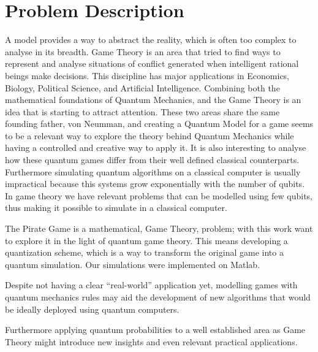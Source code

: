 \section{Problem Description}
\label{sec:int_problem}

A model provides a way to abstract the reality, which is often too complex to analyse in its breadth. Game Theory is an area that tried to find ways to represent and analyse situations of conflict generated when intelligent rational beings make decisions. This discipline has major applications in Economics, Biology, Political Science, and Artificial Intelligence. 
Combining both the mathematical foundations of Quantum Mechanics, and the Game Theory is an idea that is starting to attract attention. These two areas share the same founding father, von Neumman, and creating a Quantum Model for a game seems to be a relevant way to explore the theory behind Quantum Mechanics while having a controlled and creative way to apply it. It is also interesting to analyse how these quantum games differ from their well defined classical counterparts. Furthermore  simulating quantum algorithms on a classical computer is usually impractical because this systems grow exponentially with the number of qubits. In game theory we have relevant problems that can be modelled using few qubits, thus making it possible to simulate in a classical computer.

The Pirate Game is a mathematical, Game Theory, problem; with this work want to explore it in the light of quantum game theory. This means developing a quantization scheme, which is a way to transform the original game into a quantum simulation. Our simulations were implemented on Matlab.

Despite not having a clear ``real-world'' application yet, modelling games with quantum mechanics rules may aid the development of new algorithms that would be ideally deployed using quantum computers. 

Furthermore applying quantum probabilities to a well established area as Game Theory might introduce new insights and even relevant practical applications\cite{Eisert2008}. 



